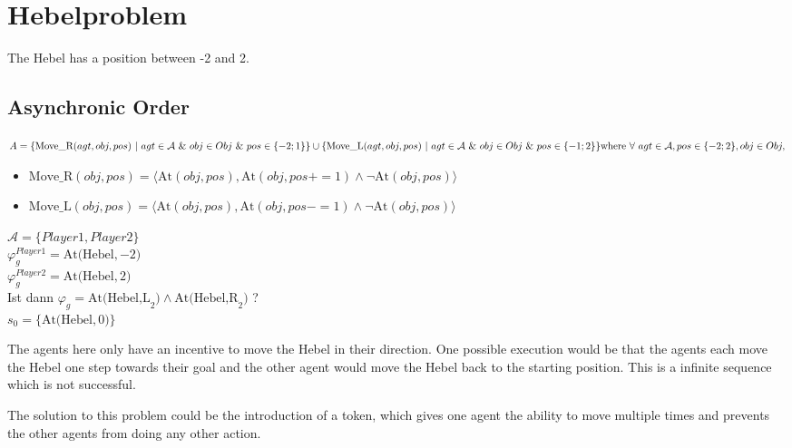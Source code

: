 \section{Hebelproblem}
The Hebel has a position between -2 and 2.
\newpage
\subsection{Asynchronic Order}
$
A=
\{\text{Move\_R}(agt,obj,pos) \ | \ agt \in \mathcal{A} \ \& \ obj \in Obj \ \& \ pos \in \{ -2;1\}\} \cup \\
\{\text{Move\_L}(agt,obj,pos) \ | \ agt \in \mathcal{A} \ \& \ obj \in Obj \ \& \ pos \in \{ -1;2\}\} \\
\text{where} \ \forall \ agt \in \mathcal{A}, pos \in \{ -2;2\}, obj \in Obj ,
$
\begin{itemize}
  \item $
    \text{Move\_R}(obj,pos) = \langle \text{At}(obj, pos) , \text{At}(obj, pos+=1) \wedge \neg \text{At}(obj,pos) \rangle
    $
  \item $
    \text{Move\_L}(obj,pos) = \langle \text{At}(obj, pos) , \text{At}(obj, pos-=1) \wedge \neg \text{At}(obj,pos) \rangle
    $
\end{itemize}
$\mathcal{A}= \{Player1, Player2\}$ \\
$\varphi^{Player1}_g = \text{At(Hebel},-2)$  \\
$\varphi^{Player2}_g = \text{At(Hebel},2)$ \\
Ist dann $\varphi_g = \text{At(Hebel,L}_2) \wedge \text{At(Hebel,R}_2)$ ? \\
$s_0 = \{\text{At(Hebel}, 0) \}$


The agents here only have an incentive to move the Hebel in their direction. One possible execution would be that the agents each move the Hebel one step towards their goal and the other agent would move the Hebel back to the starting position. This is a infinite sequence which is not successful.

The solution to this problem could be the introduction of a token, which gives one agent the ability to move multiple times and prevents the other agents from doing any other action.

\newpage

